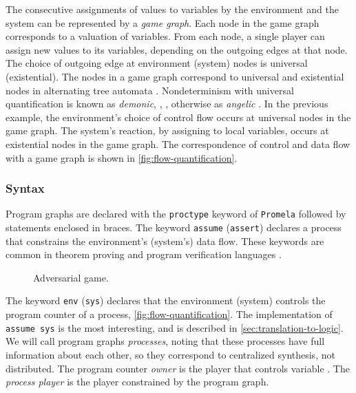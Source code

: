 \documentclass[copyright]{eptcs}
\begin{document}
The consecutive assignments of values to variables by the environment and the system can be represented by a {\em game graph}.
Each node in the game graph corresponds to a valuation of variables.
From each node, a single player can assign new values to its variables, depending on the outgoing edges at that node.
The choice of outgoing edge at environment (system) nodes is universal (existential).
The nodes in a game graph correspond to universal and existential nodes in alternating tree automata \cite{Chandra81jacm,Muller86alp,Vardi95cst,Vardi96lc,Kupferman05focs}.
Nondeterminism with universal quantification is known as {\em demonic}, \cite[p.85]{Hoare85csp}, \cite{Sondergaard1992cj}, otherwise as {\em angelic} \cite{McCarthy63,Floyd67jacm,Broy86tcs}.
In the previous example, the environment's choice of control flow occurs at universal nodes in the game graph.
The system's reaction, by assigning to local variables, occurs at existential nodes in the game graph.
The correspondence of control and data flow with a game graph is shown in \cref{fig:flow-quantification}.


\subsubsection{Syntax}

Program graphs are declared with the \texttt{proctype} keyword of \texttt{Promela} followed by statements enclosed in braces.
The keyword \texttt{assume} (\texttt{assert}) declares a process that constrains the environment's (system's) data flow.
These keywords are common in theorem proving and program verification languages \cite{Leino10lpair}.

\begin{wrapfigure}{r}{6cm}
\centering
{}
\caption{Adversarial game.}
\label{fig:board_game}
\end{wrapfigure}

The keyword \texttt{env} (\texttt{sys}) declares that the environment (system) controls the program counter  of a process, \cref{fig:flow-quantification}.
The implementation of \texttt{assume sys} is the most interesting, and is described in \cref{sec:translation-to-logic}.
We will call program graphs {\em processes}, noting that these processes have full information about each other, so they correspond to centralized synthesis, not distributed.
The program counter {\em owner} is the player that controls variable .
The {\em process player} is the player constrained by the program graph.
\end{document}
